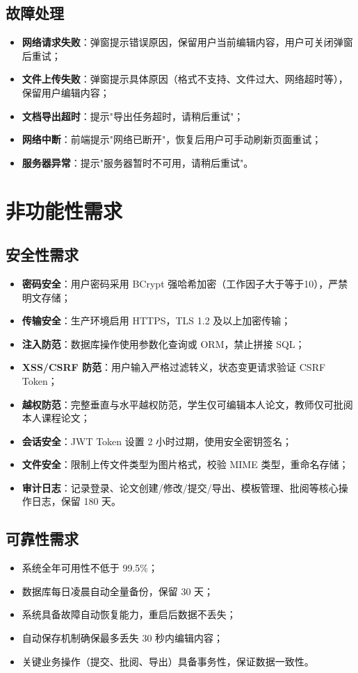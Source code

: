 \documentclass{softeng}
\begin{document}
\subsection{故障处理}
	\begin{itemize}
	\item \textbf{网络请求失败}：弹窗提示错误原因，保留用户当前编辑内容，用户可关闭弹窗后重试；
	\item \textbf{文件上传失败}：弹窗提示具体原因（格式不支持、文件过大、网络超时等），保留用户编辑内容；
	\item \textbf{文档导出超时}：提示"导出任务超时，请稍后重试"；
	\item \textbf{网络中断}：前端提示"网络已断开"，恢复后用户可手动刷新页面重试；
	\item \textbf{服务器异常}：提示"服务器暂时不可用，请稍后重试"。
	\end{itemize}
	


\section{非功能性需求}
\subsection{安全性需求}
	\begin{itemize}
		\item \textbf{密码安全}：用户密码采用 BCrypt 强哈希加密（工作因子大于等于10），严禁明文存储；
		\item \textbf{传输安全}：生产环境启用 HTTPS，TLS 1.2 及以上加密传输；
		\item \textbf{注入防范}：数据库操作使用参数化查询或 ORM，禁止拼接 SQL；
		\item \textbf{XSS/CSRF 防范}：用户输入严格过滤转义，状态变更请求验证 CSRF Token；
		\item \textbf{越权防范}：完整垂直与水平越权防范，学生仅可编辑本人论文，教师仅可批阅本人课程论文；
		\item \textbf{会话安全}：JWT Token 设置 2 小时过期，使用安全密钥签名；
		\item \textbf{文件安全}：限制上传文件类型为图片格式，校验 MIME 类型，重命名存储；
		\item \textbf{审计日志}：记录登录、论文创建/修改/提交/导出、模板管理、批阅等核心操作日志，保留 180 天。
	\end{itemize}
	
\subsection{可靠性需求}
	\begin{itemize}
		\item 系统全年可用性不低于 99.5\%；
		\item 数据库每日凌晨自动全量备份，保留 30 天；
		\item 系统具备故障自动恢复能力，重启后数据不丢失；
		\item 自动保存机制确保最多丢失 30 秒内编辑内容；
		\item 关键业务操作（提交、批阅、导出）具备事务性，保证数据一致性。
	\end{itemize}
	
\end{document}
